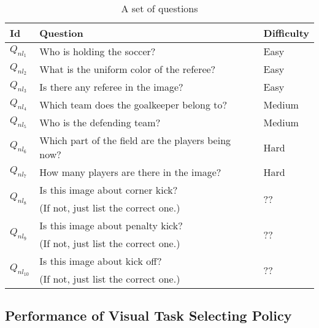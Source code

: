 \begin{table}[thb] 
\footnotesize
\begin{tabular}{|l|l|l|}
\hline
Id & Question                                           & Difficulty \\ \hline
$Q_{nl_1}$  & Who is holding the soccer?                         & Easy       \\ \hline
$Q_{nl_2}$  & What is the uniform color of the referee?           & Easy       \\ \hline
$Q_{nl_3}$  & Is there any referee in the image?                 & Easy       \\ \hline
$Q_{nl_4}$  & Which team does the goalkeeper belong to?          & Medium       \\ \hline
$Q_{nl_5}$  & Who is the defending team?                         & Medium       \\ \hline
$Q_{nl_6}$  & Which part of the field are the players being now? & Hard       \\ \hline
$Q_{nl_7}$  & How many players are there in the image?           & Hard     \\ \hline

\multirow{2}{*}{$Q_{nl_8}$ }
 & Is this image about corner kick?           &  \multirow{2}{*}{\color{red}??}  \\ 
 & {\color{red}(If not, just list the correct one.)}  & \\ \hline
 
\multirow{2}{*}{$Q_{nl_9}$}  &   Is this image about penalty kick?  &  \multirow{2}{*}{\color{red}??}    \\ 
 & {\color{red}(If not, just list the correct one.)}  &  \\ \hline
 
\multirow{2}{*}{$Q_{nl_{10}}$}  &  Is this image about kick off?  &  \multirow{2}{*}{\color{red}??}    \\ 
 & {\color{red}(If not, just list the correct one.)}  &  \\ \hline
 
\end{tabular} 
\caption{A set of questions} \label{table:questions}
\end{table}




\subsection{Performance of Visual Task Selecting Policy }

